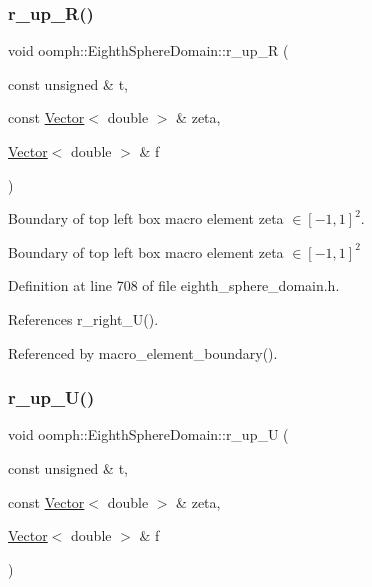 \subsubsection{\texorpdfstring{r\+\_\+up\+\_\+\+R()}{r\_up\_R()}}
{\footnotesize\ttfamily void oomph\+::\+Eighth\+Sphere\+Domain\+::r\+\_\+up\+\_\+R (\begin{DoxyParamCaption}\item[{const unsigned \&}]{t,  }\item[{const \hyperlink{classoomph_1_1Vector}{Vector}$<$ double $>$ \&}]{zeta,  }\item[{\hyperlink{classoomph_1_1Vector}{Vector}$<$ double $>$ \&}]{f }\end{DoxyParamCaption})\hspace{0.3cm}{\ttfamily [private]}}



Boundary of top left box macro element zeta $ \in [-1,1]^2 $. 

Boundary of top left box macro element zeta $ \in [-1,1]^2 $ 

Definition at line 708 of file eighth\+\_\+sphere\+\_\+domain.\+h.



References r\+\_\+right\+\_\+\+U().



Referenced by macro\+\_\+element\+\_\+boundary().

\mbox{\label{classoomph_1_1EighthSphereDomain_a303c406fe673675f497522dae69f849c}} 
\subsubsection{\texorpdfstring{r\+\_\+up\+\_\+\+U()}{r\_up\_U()}}
{\footnotesize\ttfamily void oomph\+::\+Eighth\+Sphere\+Domain\+::r\+\_\+up\+\_\+U (\begin{DoxyParamCaption}\item[{const unsigned \&}]{t,  }\item[{const \hyperlink{classoomph_1_1Vector}{Vector}$<$ double $>$ \&}]{zeta,  }\item[{\hyperlink{classoomph_1_1Vector}{Vector}$<$ double $>$ \&}]{f }\end{DoxyParamCaption})\hspace{0.3cm}{\ttfamily [private]}}



